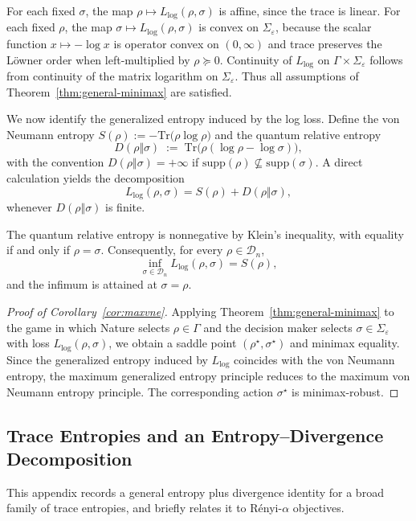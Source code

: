 \documentclass{article}
\theoremstyle{plain}
\theoremstyle{definition}
\begin{document}
\begin{appendices}
For each fixed $\sigma$, the map $\rho\mapsto L_{\log}(\rho,\sigma)$ is affine, since
the trace is linear. For each fixed $\rho$, the map
$\sigma\mapsto L_{\log}(\rho,\sigma)$ is convex on $\Sigma_\varepsilon$, because the
scalar function $x\mapsto -\log x$ is operator convex on $(0,\infty)$ and trace
preserves the L\"owner order when left-multiplied by $\rho\succeq 0$. Continuity of
$L_{\log}$ on $\Gamma\times\Sigma_\varepsilon$ follows from continuity of the matrix
logarithm on $\Sigma_\varepsilon$. Thus all assumptions of
Theorem~\ref{thm:general-minimax} are satisfied.

We now identify the generalized entropy induced by the log loss.
Define the von Neumann entropy
$S(\rho):=-\mathrm{Tr}\bigl(\rho\log\rho\bigr)$ and the quantum relative entropy
\[
D(\rho\Vert\sigma)
\;:=\;
\mathrm{Tr}\bigl(\rho(\log\rho-\log\sigma)\bigr),
\]
with the convention $D(\rho\Vert\sigma)=+\infty$ if
$\mathrm{supp}(\rho)\nsubseteq\mathrm{supp}(\sigma)$.
A direct calculation yields the decomposition
\[
L_{\log}(\rho,\sigma)
=
S(\rho)+D(\rho\Vert\sigma),
\]
whenever $D(\rho\Vert\sigma)$ is finite.

The quantum relative entropy is nonnegative by Klein’s inequality, with equality
if and only if $\rho=\sigma$. Consequently, for every $\rho\in\mathcal{D}_n$,
\[
\inf_{\sigma\in\mathcal{D}_n} L_{\log}(\rho,\sigma)
=
S(\rho),
\]
and the infimum is attained at $\sigma=\rho$.

\begin{proof}[Proof of Corollary~\ref{cor:maxvne}]
Applying Theorem~\ref{thm:general-minimax} to the game in which Nature selects
$\rho\in\Gamma$ and the decision maker selects $\sigma\in\Sigma_\varepsilon$ with
loss $L_{\log}(\rho,\sigma)$, we obtain a saddle point
$(\rho^\star,\sigma^\star)$ and minimax equality. Since the generalized entropy
induced by $L_{\log}$ coincides with the von Neumann entropy, the maximum generalized
entropy principle reduces to the maximum von Neumann entropy principle. The
corresponding action $\sigma^\star$ is minimax-robust.
\end{proof}


\subsection{Trace Entropies and an Entropy--Divergence Decomposition}
\label{app:trace-bregman}

This appendix records a general entropy plus divergence identity for a broad
family of trace entropies, and briefly relates it to R\'enyi-$\alpha$ objectives.


\end{appendices}
\end{document}
